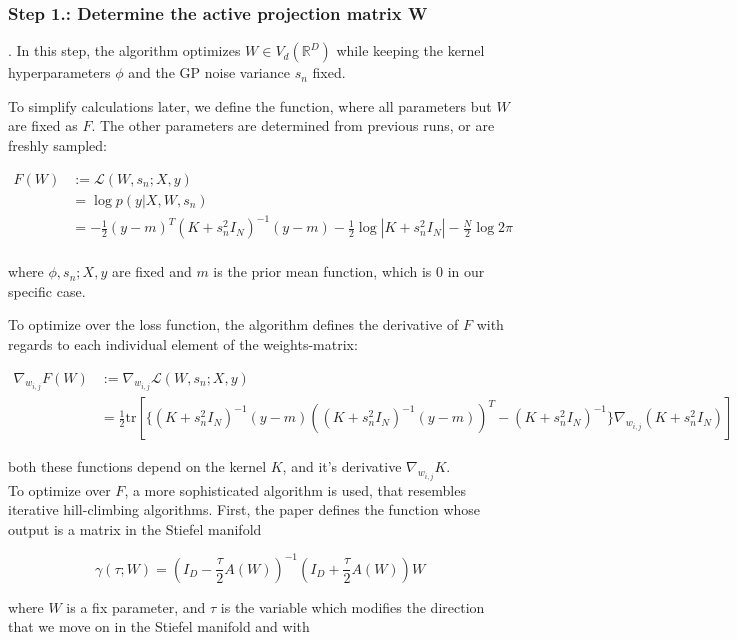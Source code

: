 \documentclass[a4paper,12pt,twoside,openright]{report}
\begin{document}
\subsubsection{Step 1.: Determine the active projection matrix W}.
In this step, the algorithm optimizes $W \in V_d(\mathbb{R}^D)$ while keeping the kernel hyperparameters $\phi$ and the GP noise variance $s_n$ fixed.

To simplify calculations later, we define the function, where all parameters but $W$ are fixed as $F$. 
The other parameters are determined from previous runs, or are freshly sampled:

\begin{align}
F(W) &:= \mathcal{L}(W, s_n; X, y) \\
& = \log p(y | X, W, s_n) \\
& =  -\frac{1}{2} (y - m)^T (K + s_n^2 I_N)^{-1} (y - m) -\frac{1}{2} \log|K + s_n^2 I_N| -\frac{N}{2} \log 2 \pi   \\
\end{align}

where $\phi, s_n; X, y$ are fixed and $m$ is the prior mean function, which is 0 in our specific case.

To optimize over the loss function, the algorithm defines the derivative of $F$ with regards to each individual element of the weights-matrix:

\begin{align}
\nabla_{w_{i,j}} F(W) &:= \nabla_{w_{i,j}} \mathcal{L}(W, s_n; X, y) \\
& = \frac{1}{2} \text{tr} \left[ \{ (K + s_n^2 I_N)^{-1} (y-m) \left( (K + s_n^2 I_N)^{-1} (y-m) \right)^T - (K + s_n^2 I_N)^{-1} \} \nabla_{w_{i,j}} (K + s_n^2 I_N) \right]
\end{align}

both these functions depend on the kernel $K$, and it's derivative $\nabla_{w_{i,j}} K$. \\

To optimize over $F$, a more sophisticated algorithm is used, that resembles iterative hill-climbing algorithms.
First, the paper defines the function whose output is a matrix in the Stiefel manifold

\begin{equation}
\gamma(\tau; W) = (I_D - \frac{\tau}{2} A(W) )^{-1} (I_D + \frac{\tau}{2} A(W) ) W
\end{equation}


where $W$ is a fix parameter, and $\tau$ is the variable which modifies the direction that we move on in the Stiefel manifold and with
\end{document}
